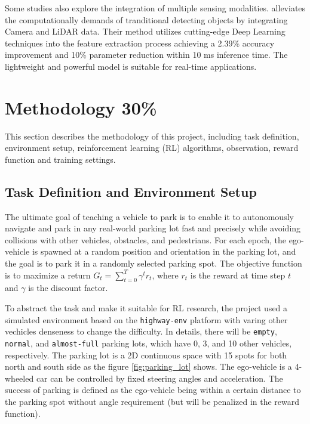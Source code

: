 \documentclass{article}
\begin{document}
Some studies also explore the integration of multiple sensing modalities. \citet{pederiva2025light} alleviates the computationally demands of tranditional detecting objects by integrating Camera and LiDAR data. Their method utilizes cutting-edge Deep Learning techniques into the feature extraction process achieving a 2.39\% accuracy improvement and 10\% parameter reduction within 10 ms inference time. The lightweight and powerful model is suitable for real-time applications.

\section{Methodology 30\%}\label{sec:methodology}

This section describes the methodology of this project, including task definition, environment setup, reinforcement learning (RL) algorithms, observation, reward function and training settings.

\subsection{Task Definition and Environment Setup}

The ultimate goal of teaching a vehicle to park is to enable it to autonomously navigate and park in any real-world parking lot fast and precisely while avoiding collisions with other vehicles, obstacles, and pedestrians. For each epoch, the ego-vehicle is spawned at a random position and orientation in the parking lot, and the goal is to park it in a randomly selected parking spot. The objective function is to maximize a return $G_t = \sum_{t=0}^{T} \gamma^t r_t$, where $r_t$ is the reward at time step $t$ and $\gamma$ is the discount factor.

To abstract the task and make it suitable for RL research, the project used a simulated environment based on the \texttt{highway-env} platform \cite{highway-env} with varing other vechicles denseness to change the difficulty. In details, there will be \texttt{empty}, \texttt{normal}, and \texttt{almost-full} parking lots, which have 0, 3, and 10 other vehicles, respectively. The parking lot is a 2D continuous space with 15 spots for both north and south side as the figure \ref{fig:parking_lot} shows. The ego-vehicle is a 4-wheeled car can be controlled by fixed steering angles and acceleration. The success of parking is defined as the ego-vehicle being within a certain distance to the parking spot without angle requirement (but will be penalized in the reward function).
\end{document}
